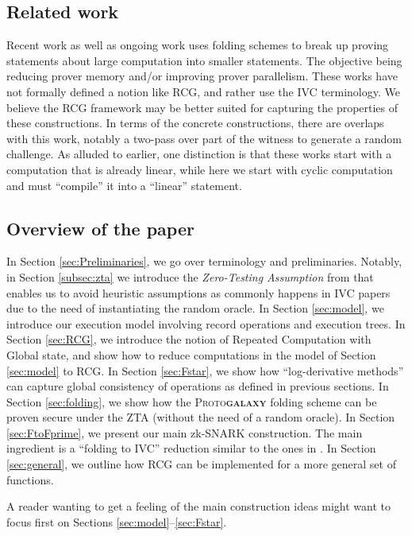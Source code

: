 \documentclass[11pt]{article} %
\newcommand{\protogal}{{\normalfont\scshape Proto\bfseries{galaxy}}\xspace}
\begin{document}
\subsection{Related work}
Recent work \cite{moonmoon, mangrove} as well as ongoing work \cite{jenstalk} uses folding schemes \cite{othernova,nova} to break up proving statements about large computation into smaller statements.
The objective being reducing prover memory and/or improving prover parallelism.
These works have not formally defined a notion like RCG, and rather use the IVC terminology. We believe the RCG framework may be better suited for
capturing the properties of these constructions. In terms of the concrete constructions, there are overlaps with this work, notably a two-pass over
part of the witness to generate a random challenge. As alluded to earlier,
one distinction is that these works start with a computation that is already linear, while here we start with cyclic computation and must ``compile'' it into a ``linear'' statement.
\subsection{Overview of the paper}



In Section \ref{sec:Preliminaries}, we go over terminology and preliminaries.
Notably, in Section \ref{subsec:zta} we introduce the \emph{Zero-Testing Assumption} from \cite{novarecursive} that enables us to
avoid heuristic assumptions as commonly happens in IVC papers due to the need of instantiating the random oracle.
In Section \ref{sec:model}, we introduce our execution model involving record operations and execution trees.
In Section \ref{sec:RCG}, we introduce the notion of Repeated Computation with Global state, and show how to reduce computations in the model of Section \ref{sec:model} to RCG.
In Section \ref{sec:Fstar}, we show how ``log-derivative methods'' \cite{bplusplus,logup} can capture global consistency of operations
as defined in previous sections.
In Section \ref{sec:folding}, we show how the \protogal folding scheme \cite{protogalaxy} can be proven secure under the ZTA (without
the need of a random oracle).
In Section \ref{sec:FtoFprime}, we present our main zk-SNARK construction. The main ingredient is a ``folding to IVC'' reduction similar to the ones in 
\cite{othernova,nova}.
In Section \ref{sec:general}, we outline how RCG can be implemented for a more general set of functions.

A reader wanting to get a feeling of the main construction ideas might want to focus first on Sections \ref{sec:model}--\ref{sec:Fstar}.
\end{document}
